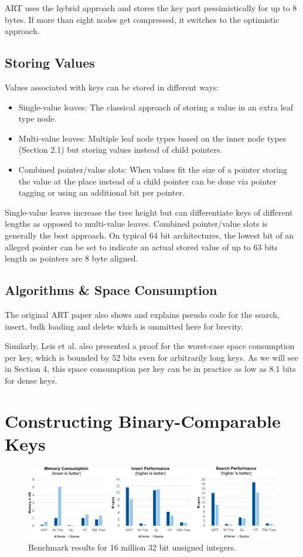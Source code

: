 \documentclass[acmtog, nonacm]{acmart}
\begin{document}
ART uses the hybrid approach and stores the key part pessimistically for up to 8 bytes. If more than eight nodes 
get compressed, it switches to the optimistic approach.

\subsection{Storing Values}
Values associated with keys can be stored in different ways:
\begin{itemize}
    \item Single-value leaves: The classical approach of storing a value in an extra leaf type node.
    \item Multi-value leaves: Multiple leaf node types based on the inner node types (Section 2.1) 
    but storing values instead of child pointers.
    \item Combined pointer/value slots: When values fit the size of a pointer storing the value at the place instead 
    of a child pointer can be done via pointer tagging or using an additional bit per pointer.
\end{itemize}

Single-value leaves increase the tree height but can differentiate keys of different lengths as opposed to 
multi-value leaves. Combined pointer/value slots is generally the best approach. On typical 64 bit architectures, 
the lowest bit of an alleged pointer can be set to indicate an actual stored value of up to 63 bits length as 
pointers are 8 byte aligned.

\subsection{Algorithms \& Space Consumption}
The original ART paper \cite{6544812} also shows and explains pseudo code for the search, insert, 
bulk loading and delete which is ommitted here for brevity.

Similarly, Leis et al. also presented a proof for the worst-case space consumption per key, which is bounded by 52 bits even for
arbitrarily long keys. As we will see in Section 4, this space consumption per key can be in practice as low as 8.1 bits
for dense keys.

\section{Constructing Binary-Comparable Keys}

\begin{figure}
    \centering
    \includegraphics[width=\textwidth]{images/06-art-micro-benchmark-16.PNG}
    \caption{Benchmark results for 16 million 32 bit unsigned integers.}
    \label{fig:art-micro-benchmark-16}
\end{figure}
\end{document}
